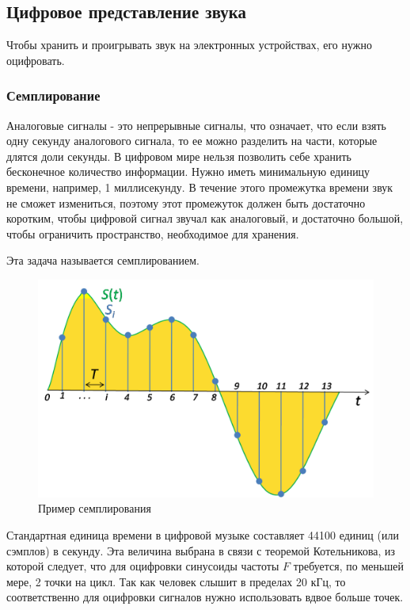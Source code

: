 \subsection{Цифровое представление звука}
Чтобы хранить и проигрывать звук на электронных устройствах, его нужно оцифровать.

\subsubsection{Семплирование}
Аналоговые сигналы - это непрерывные сигналы, что означает, что если взять одну секунду
аналогового сигнала, то ее можно разделить на части, которые длятся доли секунды.
В цифровом мире нельзя позволить себе хранить бесконечное количество информации.
Нужно иметь минимальную единицу времени, например, 1 миллисекунду.
В течение этого промежутка времени звук не сможет измениться, поэтому этот промежуток должен быть
достаточно коротким, чтобы цифровой сигнал звучал как аналоговый, и достаточно большой,
чтобы ограничить пространство, необходимое для хранения.

Эта задача называется семплированием.
\begin{figure}[H]
    \begin{center}
        \includegraphics[scale=0.3]{inc/img/Signal_Sampling.png}
        \caption{Пример семплирования}
    \end{center}
\end{figure}

Стандартная единица времени в цифровой музыке составляет 44100 единиц (или сэмплов) в секунду.
Эта величина выбрана в связи с теоремой Котельникова, из которой следует,
что для оцифровки синусоиды частоты $F$ требуется, по меньшей мере, 2 точки на цикл.
Так как человек слышит в пределах 20 кГц, то соответственно для оцифровки сигналов нужно использовать
вдвое больше точек.

